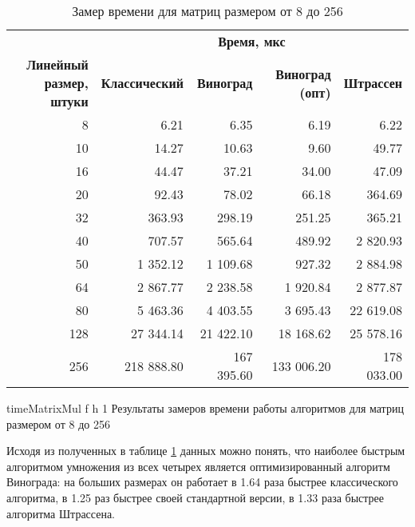 \begin{table}[ht]
	\small
	\begin{center}
		\begin{threeparttable}
			\caption{Замер времени для матриц размером от 8 до 256}
			\label{tbl:time}
			\begin{tabular}{|r|r|r|r|r|}
				\hline
				& \multicolumn{4}{c|}{\bfseries Время, мкс} \\ \cline{2-5}
				\bfseries \makecell{Линейный размер, \\ штуки} & \bfseries Классический & \bfseries Виноград & \bfseries Виноград (опт) & \bfseries Штрассен  \\ \cline{2-5}
				\hline
				8 & 6.21 & 6.35 & 6.19 & 6.22 \\
				\hline
				10 & 14.27 & 10.63 & 9.60 & 49.77 \\
				\hline
				16 & 44.47 & 37.21 & 34.00 & 47.09 \\
				\hline
				20 & 92.43 & 78.02 & 66.18 & 364.69 \\
				\hline
				32 & 363.93 & 298.19 & 251.25 & 365.21 \\
				\hline
				40 &  707.57 & 565.64 & 489.92 & 2 820.93 \\
				\hline
				50 & 1 352.12 & 1 109.68 & 927.32 & 2 884.98 \\
				\hline
				64 & 2 867.77 & 2 238.58 & 1 920.84 & 2 877.87 \\
				\hline
				80 & 5 463.36 & 4 403.55 & 3 695.43 & 22 619.08 \\
				\hline
				128 & 27 344.14 & 21 422.10 & 18 168.62 & 25 578.16 \\
				\hline
				256 & 218 888.80 & 167 395.60 & 133 006.20 & 178 033.00 \\
				\hline
			\end{tabular}	
		\end{threeparttable}
	\end{center}
\end{table}

{timeMatrixMul} %
{f} %
{h} %
{1\textwidth} %
{Результаты замеров времени работы алгоритмов для  матриц размером от 8 до 256} %

Исходя из полученных в таблице \ref{tbl:time} данных можно понять, что наиболее быстрым алгоритмом умножения из всех четырех является оптимизированный алгоритм Винограда: на больших размерах он работает в 1.64 раза быстрее классического алгоритма, в 1.25 раз быстрее своей стандартной версии, в 1.33 раза быстрее алгоритма Штрассена.

